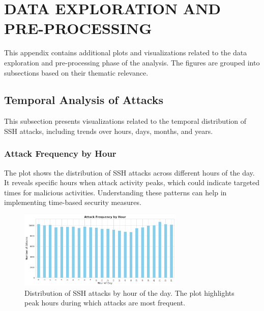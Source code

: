 

\section{DATA EXPLORATION AND PRE-PROCESSING}


    This appendix contains additional plots and visualizations related to the data exploration and pre-processing phase of the analysis. The figures are grouped into subsections based on their thematic relevance.

    \subsection{Temporal Analysis of Attacks}

        This subsection presents visualizations related to the temporal distribution of SSH attacks, including trends over hours, days, months, and years.

        \subsubsection{Attack Frequency by Hour \\}
        
            The plot shows the distribution of SSH attacks across different hours of the day. It reveals specific hours when attack activity peaks, which could indicate targeted times for malicious activities. Understanding these patterns can help in implementing time-based security measures.
            
            \vspace{-0.1cm}

            \begin{figure}[H]
                \centering
                \includegraphics[width=0.7\textwidth]{../figures/plots/section1/attack_frequency_by_hour.png}
                \caption{Distribution of SSH attacks by hour of the day. The plot highlights peak hours during which attacks are most frequent.}
                \label{fig:attack_frequency_by_hour}
            \end{figure}

